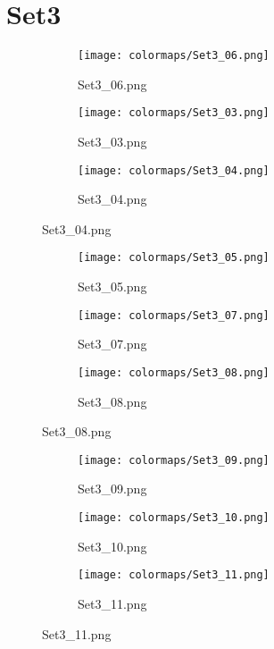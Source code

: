 \documentclass{article}%
\begin{document}
%
\newpage%
\section{Set3}%
\label{sec:Set3}%
\hspace{1cm}\hfill%
\hspace{1cm}\hfill%
\hspace{1cm}\hfill%


\begin{figure}[h!]%
\begin{subfigure}[b]{0.3\linewidth}%
\texttt{[image: colormaps/Set3\_06.png]}%
\caption{Set3\_06.png}%
\end{subfigure}%
\begin{subfigure}[b]{0.3\linewidth}%
\texttt{[image: colormaps/Set3\_03.png]}%
\caption{Set3\_03.png}%
\end{subfigure}%
\begin{subfigure}[b]{0.3\linewidth}%
\texttt{[image: colormaps/Set3\_04.png]}%
\caption{Set3\_04.png}%
\end{subfigure}%
\end{figure}

%
\hspace{1cm}\hfill%
\hspace{1cm}\hfill%
\hspace{1cm}\hfill%


\begin{figure}[h!]%
\begin{subfigure}[b]{0.3\linewidth}%
\texttt{[image: colormaps/Set3\_05.png]}%
\caption{Set3\_05.png}%
\end{subfigure}%
\begin{subfigure}[b]{0.3\linewidth}%
\texttt{[image: colormaps/Set3\_07.png]}%
\caption{Set3\_07.png}%
\end{subfigure}%
\begin{subfigure}[b]{0.3\linewidth}%
\texttt{[image: colormaps/Set3\_08.png]}%
\caption{Set3\_08.png}%
\end{subfigure}%
\end{figure}

%
\hspace{1cm}\hfill%
\hspace{1cm}\hfill%
\hspace{1cm}\hfill%


\begin{figure}[h!]%
\begin{subfigure}[b]{0.3\linewidth}%
\texttt{[image: colormaps/Set3\_09.png]}%
\caption{Set3\_09.png}%
\end{subfigure}%
\begin{subfigure}[b]{0.3\linewidth}%
\texttt{[image: colormaps/Set3\_10.png]}%
\caption{Set3\_10.png}%
\end{subfigure}%
\begin{subfigure}[b]{0.3\linewidth}%
\texttt{[image: colormaps/Set3\_11.png]}%
\caption{Set3\_11.png}%
\end{subfigure}%
\end{figure}
\end{document}
